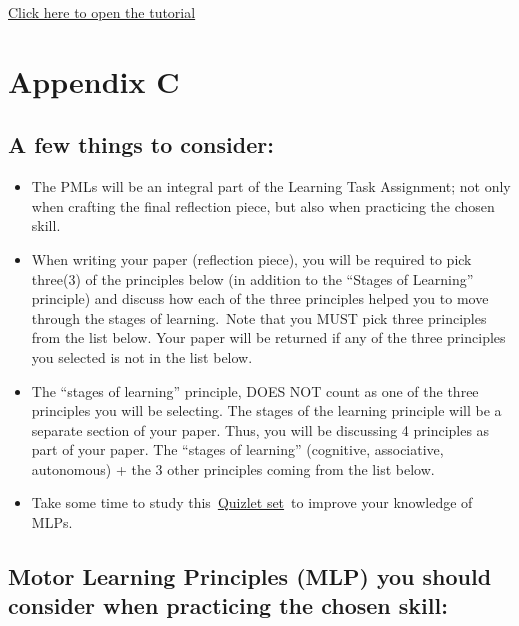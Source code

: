 \documentclass[
  letterpaper,
  DIV=11,
  numbers=noendperiod]{scrartcl}
\providecommand{\tightlist}{%
  \setlength{\itemsep}{0pt}\setlength{\parskip}{0pt}}\usepackage{longtable,booktabs,array}
\begin{document}
\href{https://csun.h5p.com/content/1291224630470015058}{Click here to
open the tutorial}

\hypertarget{sec-appendix-c}{%
\section{Appendix C}\label{sec-appendix-c}}

\hypertarget{a-few-things-to-consider-1}{%
\subsection{\texorpdfstring{\textbf{A few things to
consider:}}{A few things to consider:}}\label{a-few-things-to-consider-1}}

\begin{itemize}
\tightlist
\item
  The PMLs will be an integral part of the Learning Task Assignment; not
  only when crafting the final reflection piece, but also when
  practicing the chosen skill.
\item
  When writing your paper (reflection piece), you will be required to
  pick three(3) of the principles below (in addition to the ``Stages of
  Learning'' principle) and discuss how each of the three principles
  helped you to move through the stages of learning.~Note that you MUST
  pick three principles from the list below. Your paper will be returned
  if any of the three principles you selected is not in the list below.
\item
  The ``stages of learning'' principle, DOES NOT count as one of the
  three principles you will be selecting. The stages of the learning
  principle will be a separate section of your paper. Thus, you will be
  discussing 4 principles as part of your paper. The ``stages of
  learning'' (cognitive, associative, autonomous) + the 3 other
  principles coming from the list below.
\item
  Take some time to study this~\href{https://goo.gl/B9WT24}{Quizlet
  set}~to improve your knowledge of MLPs.
\end{itemize}

\hypertarget{motor-learning-principles-mlp-you-should-consider-when-practicing-the-chosen-skill}{%
\subsection{\texorpdfstring{\textbf{Motor Learning Principles (MLP) you
should consider when practicing the chosen
skill:}}{Motor Learning Principles (MLP) you should consider when practicing the chosen skill:}}\label{motor-learning-principles-mlp-you-should-consider-when-practicing-the-chosen-skill}}
\end{document}
